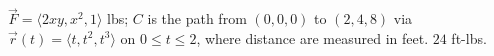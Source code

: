 {$\vec F = \langle 2xy,x^2,1\rangle$ lbs; $C$ is the path from $(0,0,0)$ to $(2,4,8)$ via $\vec r(t) = \langle t, t^2, t^3\rangle$ on $0\leq t\leq 2$, where distance are measured in feet.
}
{$24$ ft-lbs. %
}
